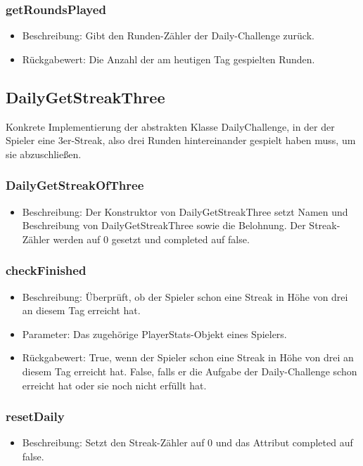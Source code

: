 \documentclass[a4paper]{scrreprt}
\begin{document}
	\subsubsection{getRoundsPlayed}
	\begin{itemize}
		\item Beschreibung: Gibt den Runden-Zähler der Daily-Challenge zurück.
		\item Rückgabewert: Die Anzahl der am heutigen Tag gespielten Runden.
	\end{itemize}

	\subsection{DailyGetStreakThree}
	Konkrete Implementierung der abstrakten Klasse DailyChallenge, in der der Spieler eine 3er-Streak, also drei Runden hintereinander gespielt haben muss, um sie abzuschließen.
	\subsubsection{DailyGetStreakOfThree}
	\begin{itemize}
		\item Beschreibung: Der Konstruktor von DailyGetStreakThree setzt Namen und Beschreibung von DailyGetStreakThree sowie die Belohnung. Der Streak-Zähler werden auf 0 gesetzt und completed auf false.
	\end{itemize}
	\subsubsection{checkFinished}
	\begin{itemize}
		\item Beschreibung: Überprüft, ob der Spieler schon eine Streak in Höhe von drei an diesem Tag erreicht hat.
		\item Parameter: Das zugehörige PlayerStats-Objekt eines Spielers.
		\item Rückgabewert: True, wenn der Spieler schon eine Streak in Höhe von drei an diesem Tag erreicht hat. False, falls er die Aufgabe der Daily-Challenge schon erreicht hat oder sie noch nicht erfüllt hat.
	\end{itemize}
	\subsubsection{resetDaily}
	\begin{itemize}
		\item Beschreibung: Setzt den Streak-Zähler auf 0 und das Attribut completed auf false.
	\end{itemize}
\end{document}
